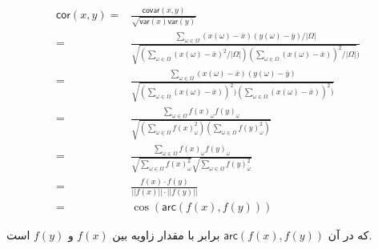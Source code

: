 \begin{solution}
$$\begin{aligned}
\textsf{cor}(x,y) =& \frac{\mathsf{covar}(x,y)}{\sqrt{\mathsf{var}(x)\mathsf{var}(y)}}\\
= & \frac{\sum_{\omega \in \Omega} (x(\omega) - \bar{x}) (y(\omega) - \bar{y})/|\Omega|}{\sqrt{(\sum_{\omega \in \Omega} (x(\omega) - \bar{x})^2/|\Omega|)(\sum_{\omega \in \Omega} (x(\omega) - \bar{x}))^2/|\Omega|})} \\
= & \frac{\sum_{\omega \in \Omega} (x(\omega) - \bar{x}) (y(\omega) - \bar{y})}{\sqrt{(\sum_{\omega \in \Omega} (x(\omega) - \bar{x}))^2)(\sum_{\omega \in \Omega} (x(\omega) - \bar{x}))^2)}} \\
= & \frac{\sum_{\omega \in \Omega} f(x)_{\omega} f(y)_{\omega}}{\sqrt{(\sum_{\omega \in \Omega} f(x)_{\omega}^2)(\sum_{\omega \in \Omega} f(y)_{\omega}^2)}} \\
= & \frac{\sum_{\omega \in \Omega} f(x)_{\omega} f(y)_{\omega}}{\sqrt{\sum_{\omega \in \Omega} f(x)_{\omega}^2}\sqrt{\sum_{\omega \in \Omega} f(y)_{\omega}^2}} \\
= &  \frac{f(x)\cdot f(y)}{||f(x)|| \cdot ||f(y)||} \\
= & \cos(\textsf{arc}(f(x), f(y)))
\end{aligned} $$

که در آن $\textsf{arc}(f(x), f(y))$ برابر با مقدار زاویه بین $f(x)$ و $f(y)$ است.
\end{solution}
